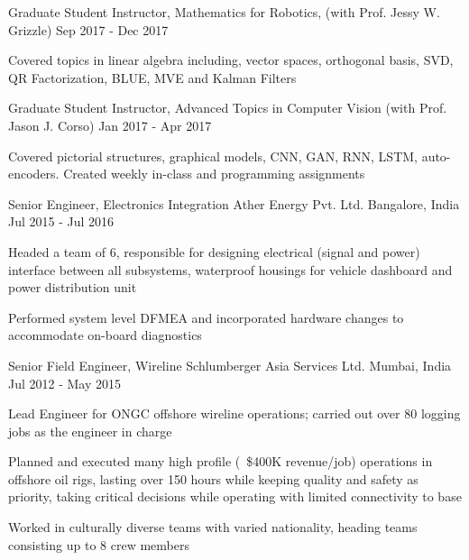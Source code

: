 \begin{cventries}
  \cventry
	{Graduate Student Instructor, Mathematics for Robotics, (with Prof. Jessy W. Grizzle)} %
	{} %
	{} %
	{Sep 2017 - Dec 2017} %
	{
		\begin{cvitems} %
			\item {Covered topics in linear algebra including, vector spaces, orthogonal basis, SVD, QR Factorization, BLUE, MVE and Kalman Filters}
		\end{cvitems}
	}
  \cventry
	{Graduate Student Instructor, Advanced Topics in Computer Vision (with Prof. Jason J. Corso)} %
	{} %
	{} %
	{Jan 2017 - Apr	 2017} %
	{
		\begin{cvitems} %
			\item {Covered pictorial structures, graphical models, CNN, GAN, RNN, LSTM, auto-encoders. Created weekly in-class and programming assignments}
		\end{cvitems}
	}      
\vspace{0.4cm}
  \cventry
    {Senior Engineer, Electronics Integration} %
    {Ather Energy Pvt. Ltd.} %
    {Bangalore, India} %
    {Jul 2015 - Jul 2016} %
    {
      \begin{cvitems} %
        \item{Headed a team of 6, responsible for designing electrical (signal and power) interface between all subsystems, waterproof housings for vehicle dashboard and power distribution unit}
        \item {Performed system level DFMEA and incorporated hardware changes to accommodate on-board diagnostics}
      \end{cvitems}
    }

  \cventry
	{Senior Field Engineer, Wireline} %
	{Schlumberger Asia Services Ltd.} %
	{Mumbai, India} %
	{Jul 2012 - May 2015} %
	{
		\begin{cvitems} %
			\item{Lead Engineer for ONGC offshore wireline operations; carried out over 80 logging jobs as the engineer in charge}
			\item {Planned and executed many high profile (~\$400K revenue/job) operations in offshore oil rigs, lasting over 150 hours while keeping quality and safety as priority, taking critical decisions while operating with limited connectivity to base}
			\item {Worked in culturally diverse teams with varied nationality, heading teams consisting up to 8 crew members}
		\end{cvitems}
	}
\vspace{-4mm}

\end{cventries}
